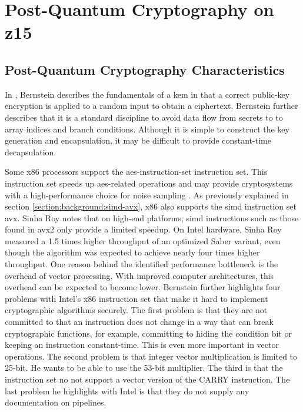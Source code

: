 \section{Post-Quantum Cryptography on z15}
\label{section:results:z15}


\subsection{Post-Quantum Cryptography Characteristics} 

In \cite{bernstein2018}, Bernstein describes the fundamentals of a \gls{kem} in that a correct public-key encryption is applied to a random input to obtain a ciphertext. Bernstein further describes that it is a standard discipline to avoid data flow from secrets to to array indices and branch conditions. Although it is simple to construct the key generation and encapsulation, it may be difficult to provide constant-time decapsulation.

Some \gls{x86} processors support the \gls{aes-instruction-set} instruction set. This instruction set speeds up \gls{aes}-related operations and may provide cryptosystems with a high-performance choice for noise sampling \cite{alkim2016}. As previously explained in section \ref{section:background:simd-avx}, \gls{x86} also supports the \gls{simd} instruction set \gls{avx}. Sinha Roy \cite{sinha2019} notes that on high-end platforms, \gls{simd} instructions such as those found in \gls{avx2} only provide a limited speedup. On Intel hardware, Sinha Roy measured a 1.5 times higher throughput of an optimized Saber variant, even though the algorithm was expected to achieve nearly four times higher throughput. One reason behind the identified performance bottleneck is the overhead of vector processing. With improved computer architectures, this overhead can be expected to become lower. Bernstein \cite{bernstein2014} further highlights four problems with Intel's \gls{x86} instruction set that make it hard to implement cryptographic algorithms securely. The first problem is that they are not committed to that an instruction does not change in a way that can break cryptographic functions, for example, committing to hiding the condition bit or keeping an instruction constant-time. This is even more important in vector operations. The second problem is that integer vector multiplication is limited to 25-bit. He wants to be able to use the 53-bit multiplier. The third is that the instruction set no not support a vector version of the CARRY instruction. The last problem he highlights with Intel is that they do not supply any documentation on pipelines.

